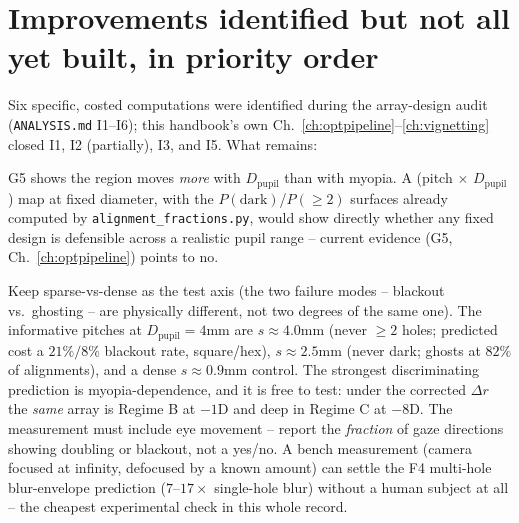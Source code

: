 \documentclass[11pt]{report}
\newcommand{\Dpupil}{D_{\text{pupil}}}
\begin{document}
\section{Improvements identified but not all yet built, in priority order}
Six specific, costed computations were identified during the array-design audit
(\texttt{ANALYSIS.md} I1--I6); this handbook's own Ch.~\ref{ch:optpipeline}--\ref{ch:vignetting}
closed I1, I2 (partially), I3, and I5. What remains:
\begin{description}[nosep]
\item[I4 -- pupil diameter as a third axis.] G5 shows the region moves \emph{more} with
$\Dpupil$ than with myopia. A (pitch $\times$ $\Dpupil$) map at fixed diameter, with the
$P(\text{dark})$/$P(\geq2)$ surfaces already computed by \texttt{alignment\_fractions.py},
would show directly whether any fixed design is defensible across a realistic pupil range --
current evidence (G5, Ch.~\ref{ch:optpipeline}) points to no.
\item[I6 -- the next experimental sample, sharpened.] Keep sparse-vs-dense as the test axis
(the two failure modes -- blackout vs.\ ghosting -- are physically different, not two degrees
of the same one). The informative pitches at $\Dpupil{=}4$mm are $s{\approx}4.0$mm (never
$\geq2$ holes; predicted cost a $21\%/8\%$ blackout rate, square/hex), $s{\approx}2.5$mm
(never dark; ghosts at $82\%$ of alignments), and a dense $s{\approx}0.9$mm control. The
strongest discriminating prediction is myopia-dependence, and it is free to test: under the
corrected $\Delta r$ the \emph{same} array is Regime B at $-1$D and deep in Regime C at
$-8$D. The measurement must include eye movement -- report the \emph{fraction} of gaze
directions showing doubling or blackout, not a yes/no. A bench measurement (camera focused
at infinity, defocused by a known amount) can settle the F4 multi-hole blur-envelope
prediction ($7$--$17\times$ single-hole blur) without a human subject at all -- the cheapest
experimental check in this whole record.
\end{description}
\end{document}
